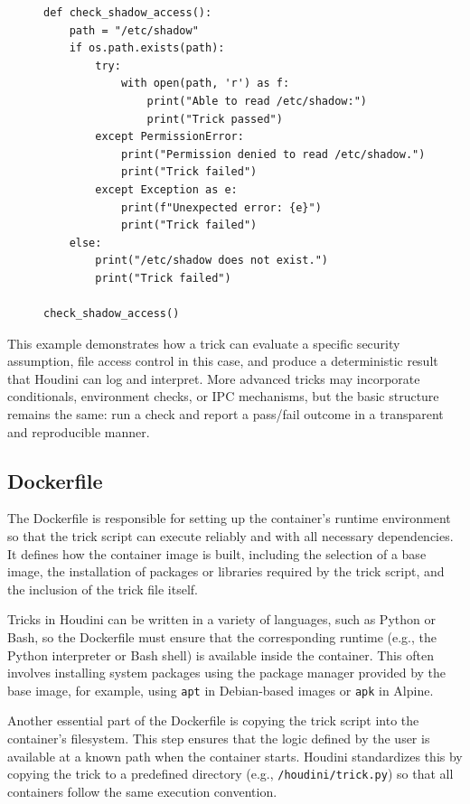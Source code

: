 \begin{doublespace}
\begin{figure}[H]
\begin{lstlisting}
def check_shadow_access():
    path = "/etc/shadow"
    if os.path.exists(path):
        try:
            with open(path, 'r') as f:
                print("Able to read /etc/shadow:")
                print("Trick passed")
        except PermissionError:
            print("Permission denied to read /etc/shadow.")
            print("Trick failed")
        except Exception as e:
            print(f"Unexpected error: {e}")
            print("Trick failed")
    else:
        print("/etc/shadow does not exist.")
        print("Trick failed")

check_shadow_access()
\end{lstlisting}
\end{figure}


This example demonstrates how a trick can evaluate a specific security assumption, file access control in this case, and produce a deterministic result that Houdini can log and interpret. More advanced tricks may incorporate conditionals, environment checks, or IPC mechanisms, but the basic structure remains the same: run a check and report a pass/fail outcome in a transparent and reproducible manner.



\subsection{Dockerfile}

The Dockerfile is responsible for setting up the container's runtime environment so that the trick script can execute reliably and with all necessary dependencies. It defines how the container image is built, including the selection of a base image, the installation of packages or libraries required by the trick script, and the inclusion of the trick file itself.

Tricks in Houdini can be written in a variety of languages, such as Python or Bash, so the Dockerfile must ensure that the corresponding runtime (e.g., the Python interpreter or Bash shell) is available inside the container. This often involves installing system packages using the package manager provided by the base image, for example, using \texttt{apt} in Debian-based images or \texttt{apk} in Alpine.

Another essential part of the Dockerfile is copying the trick script into the container's filesystem. This step ensures that the logic defined by the user is available at a known path when the container starts. Houdini standardizes this by copying the trick to a predefined directory (e.g., \texttt{/houdini/trick.py}) so that all containers follow the same execution convention.


\end{doublespace}
